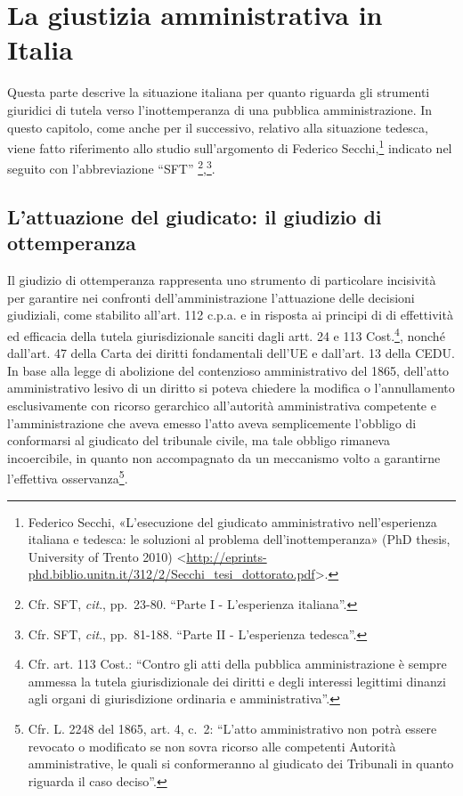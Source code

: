 \documentclass[12pt,it,a4paper,]{report}
\begin{document}
\begin{tabbing}
\end{tabbing}
\newpage

\setcounter{page}{1}
\doublespacing
\setlength{\parindent}{0.5in}

\hypertarget{la-giustizia-amministrativa-in-italia}{%
\chapter{La giustizia amministrativa in
Italia}\label{la-giustizia-amministrativa-in-italia}}

Questa parte descrive la situazione italiana per quanto riguarda gli
strumenti giuridici di tutela verso l'inottemperanza di una pubblica
amministrazione. In questo capitolo, come anche per il successivo,
relativo alla situazione tedesca, viene fatto riferimento allo studio
sull'argomento di Federico Secchi,\footnote{Federico Secchi,
  {«L'esecuzione del giudicato amministrativo nell'esperienza italiana e
  tedesca: le soluzioni al problema dell'inottemperanza»} (PhD thesis,
  University of Trento 2010)
  \textless{}\url{http://eprints-phd.biblio.unitn.it/312/2/Secchi_tesi_dottorato.pdf}\textgreater.}
indicato nel seguito con l'abbreviazione ``SFT''
\footnote{Cfr. SFT, \emph{cit}., pp.~23-80. ``Parte I - L'esperienza
  italiana''.},\footnote{Cfr. SFT, \emph{cit}., pp.~81-188. ``Parte II -
  L'esperienza tedesca''.}.

\hypertarget{lattuazione-del-giudicato-il-giudizio-di-ottemperanza}{%
\section{L'attuazione del giudicato: il giudizio di
ottemperanza}\label{lattuazione-del-giudicato-il-giudizio-di-ottemperanza}}

Il giudizio di ottemperanza rappresenta uno strumento di particolare
incisività per garantire nei confronti dell'amministrazione l'attuazione
delle decisioni giudiziali, come stabilito all'art. 112 c.p.a. e in
risposta ai principi di di effettività ed efficacia della tutela
giurisdizionale sanciti dagli artt. 24 e 113 Cost.\footnote{Cfr. art.
  113 Cost.: ``Contro gli atti della pubblica amministrazione è sempre
  ammessa la tutela giurisdizionale dei diritti e degli interessi
  legittimi dinanzi agli organi di giurisdizione ordinaria e
  amministrativa''.}, nonché dall'art. 47 della Carta dei diritti
fondamentali dell'UE e dall'art. 13 della CEDU. In base alla legge di
abolizione del contenzioso amministrativo del 1865, dell'atto
amministrativo lesivo di un diritto si poteva chiedere la modifica o
l'annullamento esclusivamente con ricorso gerarchico all'autorità
amministrativa competente e l'amministrazione che aveva emesso l'atto
aveva semplicemente l'obbligo di conformarsi al giudicato del tribunale
civile, ma tale obbligo rimaneva incoercibile, in quanto non
accompagnato da un meccanismo volto a garantirne l'effettiva
osservanza\footnote{Cfr. L. 2248 del 1865, art. 4, c.~2: ``L'atto
  amministrativo non potrà essere revocato o modificato se non sovra
  ricorso alle competenti Autorità amministrative, le quali si
  conformeranno al giudicato dei Tribunali in quanto riguarda il caso
  deciso''.}.
\end{document}
